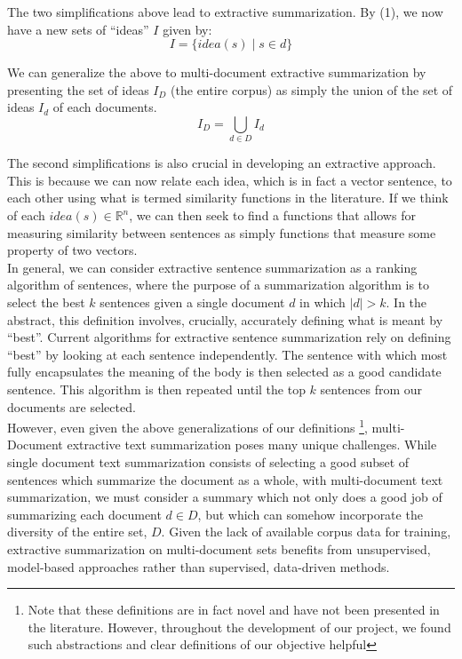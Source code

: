 \documentclass[11pt]{article}
\begin{document}
The two simplifications above lead to extractive summarization. By (1), we now have a new sets of ``ideas'' $I$ given by:
$$
I = \{idea(s) \mid s \in d \}
$$

We can generalize the above to multi-document extractive summarization by presenting the set of ideas $I_D$ (the entire corpus) as simply the union of the set of ideas $I_d$ of each documents.
$$
I_D = \bigcup_{d \in D} I_d
$$

The second simplifications is also crucial in developing an extractive approach. This is because we can now relate each idea, which is in fact a vector sentence, to each other using what is termed similarity functions in the literature. If we think of each $idea(s) \in \mathbb{R}^n$, we can then seek to find a functions that allows for measuring similarity between sentences as simply functions that measure some property of two vectors. \\

In general, we can consider extractive sentence summarization as a ranking algorithm of sentences, where the purpose of a summarization algorithm is to select the best $k$ sentences given a single document $d$ in which $|d| > k$. In the abstract, this definition involves, crucially, accurately defining what is meant by ``best''. Current algorithms for extractive sentence summarization rely on defining ``best'' by looking at each sentence independently. The sentence with which most fully encapsulates the meaning of the body is then selected as a good candidate sentence. This algorithm is then repeated until the top $k$ sentences from our documents are selected.\\

However, even given the above generalizations of our definitions \footnote{Note that these definitions are in fact novel and have not been presented in the literature. However, throughout the development of our project, we found such abstractions and clear definitions of our objective helpful}, multi-Document extractive text summarization poses many unique challenges. While single document text summarization consists of selecting a good subset of sentences which summarize the document as a whole, with multi-document text summarization, we must consider a summary which not only does a good job of summarizing each document $d \in D$, but which can somehow incorporate the diversity of the entire set, $D$. Given the lack of available corpus data for training, extractive summarization on multi-document sets benefits from unsupervised, model-based approaches rather than supervised, data-driven methods. \\
\end{document}
